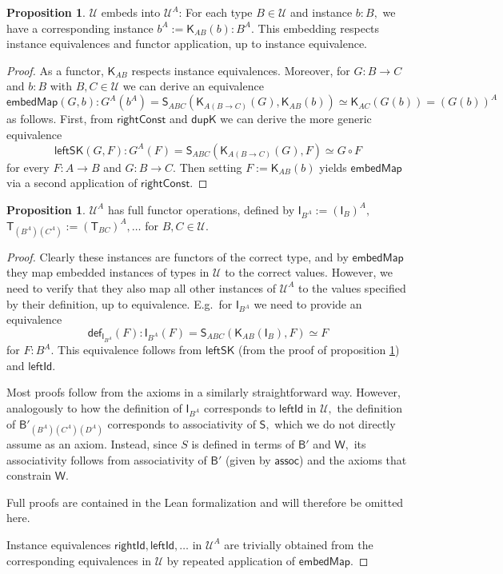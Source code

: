 \documentclass[a4paper]{article}
\theoremstyle{definition}
\newtheorem{proposition}[definition]{Proposition}
\theoremstyle{remark}
\renewcommand{\equiv}{\simeq}
\newcommand{\U}{\mathcal{U}}
\newcommand{\nm}{\mathsf}
\newcommand{\fndef}[1]{\nm{def}_{#1}}
\newcommand{\combinator}{\nm}
\newcommand{\idFun}{\combinator{I}}
\newcommand{\revAppFun}{\combinator{T}}
\newcommand{\constFun}{\combinator{K}}
\newcommand{\compFun}{\combinator{B'}}
\newcommand{\dupFun}{\combinator{W}}
\newcommand{\revSubstFun}{\combinator{S}}
\begin{document}
\begin{proposition}
  \label{prp:fun-univ-embed-map}
  $\U$ embeds into $\U^A$: For each type $B \in \U$ and instance $b : B,$ we have
  a corresponding instance $b^A := \constFun_{AB}(b) : B^A.$ This embedding
  respects instance equivalences and functor application, up to instance equivalence.
\end{proposition}
\vspace{-1ex}
\begin{proof}
  As a functor, $\constFun_{AB}$ respects instance equivalences.
  Moreover, for $G : B \to C$ and $b : B$ with $B,C \in \U$ we can derive an equivalence
  \[\nm{embedMap}(G,b) : G^A(b^A) = \revSubstFun_{ABC}(\constFun_{A(B{\to}C)}(G),\constFun_{AB}(b)) \equiv
    \constFun_{AC}(G(b)) = (G(b))^A\]
  as follows.
  First, from $\nm{rightConst}$ and $\nm{dupK}$ we can derive the more generic equivalence
  \[\nm{leftSK}(G,F) : G^A(F) = \revSubstFun_{ABC}(\constFun_{A(B{\to}C)}(G),F) \equiv G \circ F\]
  for every $F : A \to B$ and $G : B \to C.$
  Then setting $F := \constFun_{AB}(b)$ yields $\nm{embedMap}$ via a second application
  of $\nm{rightConst}.$
\end{proof}

\begin{proposition}
  \label{prp:fun-univ-full-funop}
  $\U^A$ has full functor operations, defined by $\idFun_{B^A} := (\idFun_B)^A,$
  $\revAppFun_{(B^A)(C^A)} := (\revAppFun_{BC})^A, \ldots$ for $B,C \in \U.$
\end{proposition}
\vspace{-1ex}
\begin{proof}
  Clearly these instances are functors of the correct type, and by $\nm{embedMap}$
  they map embedded instances of types in $\U$ to the correct values. However, we
  need to verify that they also map all other instances of $\U^A$ to the values
  specified by their definition, up to equivalence. E.g.\ for $\idFun_{B^A}$ we
  need to provide an equivalence
  \[\fndef{\idFun_{B^A}}(F) : \idFun_{B^A}(F) = \revSubstFun_{ABC}(\constFun_{AB}(\idFun_B),F) \equiv F\]
  for $F : B^A.$ This equivalence follows from $\nm{leftSK}$ (from the proof of
  proposition \ref{prp:fun-univ-embed-map}) and $\nm{leftId}.$

  Most proofs follow from the axioms in a similarly straightforward way. However,
  analogously to how the definition of $\idFun_{B^A}$ corresponds to $\nm{leftId}$
  in $\U,$ the definition of $\compFun_{(B^A)(C^A)(D^A)}$ corresponds to
  associativity of $\revSubstFun,$ which we do not directly assume as an axiom.
  Instead, since $S$ is defined in terms of $\compFun$ and $\dupFun,$ its
  associativity follows from associativity of $\compFun$ (given by $\nm{assoc}$)
  and the axioms that constrain $\dupFun.$

  Full proofs are contained in the Lean formalization and will therefore be
  omitted here.

  Instance equivalences $\nm{rightId}, \nm{leftId}, \ldots$ in $\U^A$ are trivially
  obtained from the corresponding equivalences in $\U$ by repeated application of
  $\nm{embedMap}.$
\end{proof}
\end{document}
